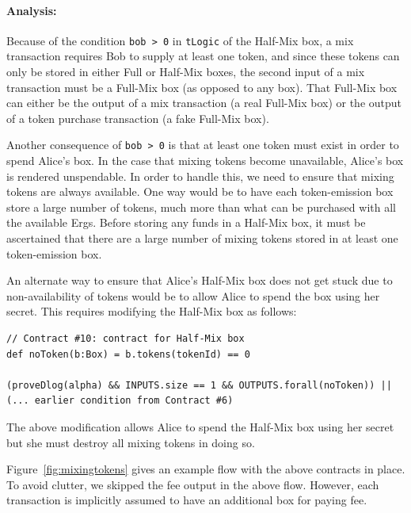 \documentclass[runningheads]{llncs}
\begin{document}
\paragraph{Analysis:} 
Because of the condition \texttt{bob > 0} in \texttt{tLogic} of the Half-Mix box, a mix transaction requires Bob to supply at least one token, and since these tokens can only be stored in either Full or Half-Mix boxes, the second input of a mix transaction must be a Full-Mix box (as opposed to any box).
That Full-Mix box can either be the output of a mix transaction (a real Full-Mix box) or the output of a token purchase transaction (a fake Full-Mix box).

Another consequence of \texttt{bob > 0} is that at least one token must exist in order to spend Alice's box. In the case that mixing tokens become unavailable, Alice's box is rendered unspendable. In order to handle this, we need to ensure that mixing tokens are always available. One way would be to have each token-emission box store a large number of tokens, much more than what can be purchased with all the available Ergs. Before storing any funds in a Half-Mix box, it must be ascertained that there are a large number of mixing tokens stored in at least one token-emission box. 

An alternate way to ensure that Alice's Half-Mix box does not get stuck due to non-availability of tokens would be to allow Alice to spend the box using her secret. This requires modifying the Half-Mix box as follows:

{\small
\begin{Verbatim}[frame=single]
// Contract #10: contract for Half-Mix box
def noToken(b:Box) = b.tokens(tokenId) == 0

(proveDlog(alpha) && INPUTS.size == 1 && OUTPUTS.forall(noToken)) || 
(... earlier condition from Contract #6)
\end{Verbatim}
}

The above modification allows Alice to spend the Half-Mix box using her secret but she must destroy all mixing tokens in doing so. 

Figure~\ref{fig:mixingtokens} gives an example flow with the above contracts in place. To avoid clutter, we skipped the fee output in the above flow. However, each transaction is implicitly assumed to have an additional box for paying fee.
\end{document}
